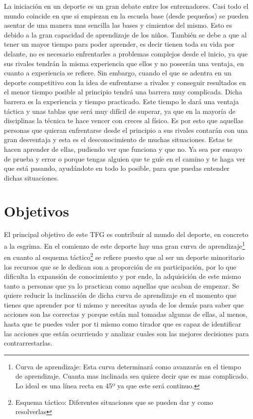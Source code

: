 La iniciación en un deporte es un gran debate entre los entrenadores. Casi todo el mundo coincide en que si empiezan en la escuela base (desde pequeños) se pueden
asentar de una manera mas sencilla las bases y cimientos del mismo. Esto es debido
a la gran capacidad de aprendizaje de los niños. También se debe a que al tener
un mayor tiempo para poder aprender, es decir tienen toda su vida por delante,
no es necesario enfrentarles a problemas complejos desde el inicio, ya que
sus rivales tendrán la misma experiencia que ellos y no poseerán una
ventaja, en cuanto a experiencia se refiere. Sin embargo, cuando el que se adentra
en un deporte competitivo con la idea de enfrentarse a rivales y conseguir resultados
en el menor tiempo posible al principio tendrá una barrera muy complicada. Dicha barrera
es la experiencia y tiempo practicado. Este tiempo le dará una ventaja táctica y unas tablas
que será muy difícil de superar, ya que en la mayoría de disciplinas la técnica
te hace vencer con creces al físico. Es por esto que aquellas personas que
quieran enfrentarse desde el principio a sus rivales contarán con una gran
desventaja y esta es el desconocimiento de muchas situaciones. Estas
te hacen aprender de ellas, pudiendo ver que funciona y que no. Ya sea por
ensayo de prueba y error o porque tengas alguien que te guíe en el camino
y te haga ver que está pasando, ayudándote en todo lo posible, para que puedas entender dichas situaciones.

\section{Objetivos}

El principal objetivo de este \acs{TFG} es contribuir al mundo del deporte, en concreto a la esgrima. En el comienzo de este deporte hay una gran curva de aprendizaje\footnote{Curva de aprendizaje: Esta curva determinará como avanzarás en el tiempo de aprendizaje. Cuanta mas inclinada sea quiere decir que es mas complicado. Lo ideal es una línea recta en 45º ya que este será continuo. }
 en cuanto al esquema táctico\footnote{Esquema táctico: Diferentes situaciones que se pueden dar y como resolverlas} se refiere puesto que al ser un deporte minoritario los
 recursos que se le dedican son a proporción de su participación, por lo que dificulta la expansión de conocimiento
 y por ende, la adquisición de este mismo tanto a personas que ya lo practican como aquellas
 que acaban de empezar. Se quiere reducir la inclinación de dicha curva de aprendizaje
 en el momento que tienes que aprender por ti mismo y necesitas ayuda de los demás
 para saber que acciones son las correctas y porque están mal tomadas algunas de ellas,
 al menos, hasta que te puedes valer por ti mismo como tirador que es capaz de identificar
 las acciones que están ocurriendo y analizar cuales son las mejores decisiones para contrarrestarlas.

